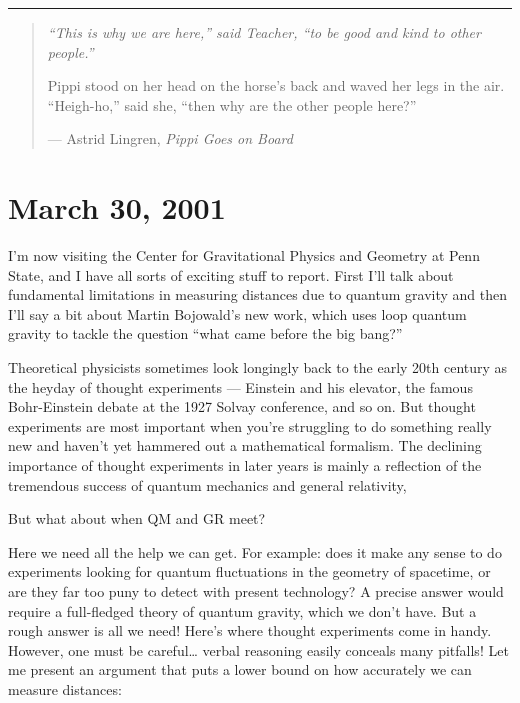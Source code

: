 \documentclass{article}
\begin{document}
\begin{center}\rule{0.5\linewidth}{0.5pt}\end{center}

\begin{quote}
\emph{``This is why we are here,'' said Teacher, ``to be good and kind
to other people.''}

Pippi stood on her head on the horse's back and waved her legs in the
air. ``Heigh-ho,'' said she, ``then why are the other people here?''

--- Astrid Lingren, \emph{Pippi Goes on Board}
\end{quote}



\hypertarget{week167}{%
\section{March 30, 2001}\label{week167}}

I'm now visiting the Center for Gravitational Physics and Geometry at
Penn State, and I have all sorts of exciting stuff to report. First I'll
talk about fundamental limitations in measuring distances due to quantum
gravity and then I'll say a bit about Martin Bojowald's new work, which
uses loop quantum gravity to tackle the question ``what came before the
big bang?''

Theoretical physicists sometimes look longingly back to the early 20th
century as the heyday of thought experiments --- Einstein and his
elevator, the famous Bohr-Einstein debate at the 1927 Solvay conference,
and so on. But thought experiments are most important when you're
struggling to do something really new and haven't yet hammered out a
mathematical formalism. The declining importance of thought experiments
in later years is mainly a reflection of the tremendous success of
quantum mechanics and general relativity,

But what about when QM and GR meet?

Here we need all the help we can get. For example: does it make any
sense to do experiments looking for quantum fluctuations in the geometry
of spacetime, or are they far too puny to detect with present
technology? A precise answer would require a full-fledged theory of
quantum gravity, which we don't have. But a rough answer is all we need!
Here's where thought experiments come in handy. However, one must be
careful\ldots{} verbal reasoning easily conceals many pitfalls! Let me
present an argument that puts a lower bound on how accurately we can
measure distances:
\end{document}
